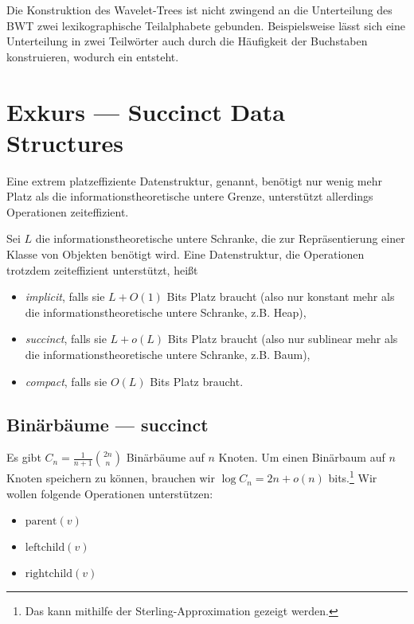 Die Konstruktion des Wavelet-Trees ist nicht zwingend an die Unterteilung des BWT zwei lexikographische Teilalphabete gebunden. Beispielsweise lässt sich eine Unterteilung in zwei Teilwörter auch durch die Häufigkeit der Buchstaben konstruieren, wodurch ein  entsteht.

\section{Exkurs --- Succinct Data Structures}

Eine extrem platzeffiziente Datenstruktur,  genannt, benötigt nur wenig mehr Platz als die informationstheoretische untere Grenze, unterstützt allerdings Operationen zeiteffizient.

Sei \( L \) die informationstheoretische untere Schranke, die zur Repräsentierung einer Klasse von Objekten benötigt wird. Eine Datenstruktur, die Operationen trotzdem zeiteffizient unterstützt, heißt
\begin{itemize}
  \item \emph{implicit}, falls sie \( L + O(1) \) Bits Platz braucht (also nur konstant mehr als die informationstheoretische untere Schranke, z.B. Heap),
  \item \emph{succinct}, falls sie \( L + o(L) \) Bits Platz braucht (also nur sublinear mehr als die informationstheoretische untere Schranke, z.B. Baum),
  \item \emph{compact}, falls sie \( O(L) \) Bits Platz braucht. 
\end{itemize}

\subsection{Binärbäume --- succinct}

Es gibt \( C_n = \frac{1}{n+1}\binom{2n}{n} \) Binärbäume auf \( n \) Knoten. Um einen Binärbaum auf \( n \) Knoten speichern zu können, brauchen wir \( \log C_n = 2n + o(n) \) bits.\footnote{Das kann mithilfe der Sterling-Approximation gezeigt werden.} Wir wollen folgende Operationen unterstützen:
\begin{itemize}
  \item \( \text{parent}(v) \)
  \item \( \text{leftchild}(v) \)
  \item \( \text{rightchild}(v) \)
\end{itemize}

